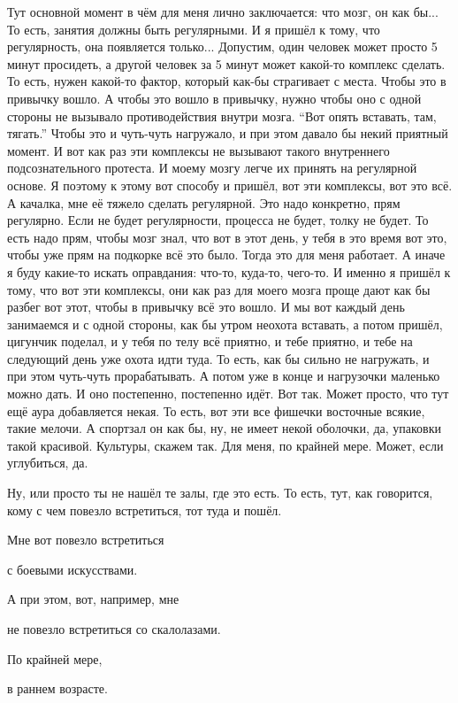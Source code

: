 \I
Тут основной момент в чём для меня лично заключается:
что мозг, он как бы...
То есть, занятия должны быть регулярными.
И я пришёл к тому, что регулярность, она появляется только...
Допустим, один человек может просто 5 минут просидеть,
а другой человек за 5 минут может какой-то комплекс сделать.
То есть, нужен какой-то фактор, который как-бы страгивает с места.
Чтобы это в привычку вошло.
А чтобы это вошло в привычку, нужно
чтобы оно с одной стороны не вызывало противодействия внутри мозга.
``Вот опять вставать, там, тягать.''
Чтобы это и чуть-чуть нагружало, и при этом давало бы некий приятный момент.
И вот как раз эти комплексы не вызывают такого внутреннего подсознательного протеста.
И моему мозгу легче их принять на регулярной основе.
Я поэтому к этому вот способу и пришёл, вот эти комплексы, вот это всё.
А качалка, мне её тяжело сделать регулярной.
Это надо конкретно, прям регулярно.
Если не будет регулярности, процесса не будет, толку не будет.
То есть надо прям,
чтобы мозг знал, что вот в этот день, у тебя в это время вот это,
чтобы уже прям на подкорке всё это было.
Тогда это для меня работает.
А иначе я буду какие-то искать оправдания: что-то, куда-то, чего-то.
И именно я пришёл к тому, что вот эти комплексы, они как раз для моего мозга
проще дают как бы разбег вот этот, чтобы в привычку всё это вошло.
И мы вот каждый день занимаемся и с одной стороны,
как бы утром неохота вставать, а потом
пришёл, цигунчик поделал,
и у тебя по телу всё приятно, и тебе приятно,
и тебе на следующий день уже охота
идти туда.
То есть, как бы
сильно не нагружать, и при этом
чуть-чуть прорабатывать. А потом уже
в конце и нагрузочки маленько можно
дать. И оно постепенно,
постепенно идёт.
Вот так.
Может просто, что
тут ещё аура добавляется некая.
То есть, вот эти все
фишечки восточные всякие,
такие мелочи. А спортзал
он как бы, ну, не
имеет некой
оболочки, да, упаковки
такой красивой.
Культуры, скажем так. Для меня,
по крайней мере. Может, если углубиться, да.

\A
Ну, или просто ты не нашёл
те залы, где это есть.
То есть, тут, как говорится, кому
с чем повезло
встретиться,
тот туда и пошёл.

Мне вот повезло встретиться

с боевыми искусствами.

А при этом, вот, например, мне

не повезло встретиться со скалолазами.

По крайней мере,

в раннем возрасте.

